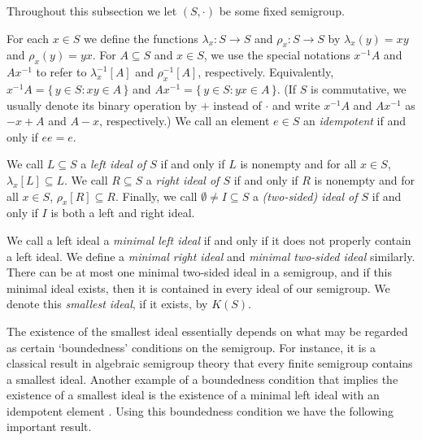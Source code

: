 \documentclass[12pt,showtrims]{memoir}
\theoremstyle{plain}
\theoremstyle{definition}
\begin{document}
Throughout this subsection we let $(S, \cdot)$ be some fixed semigroup. 

For each $x \in S$ we define the functions $\lambda_x \colon S \to S$ and $\rho_x \colon S \to S$ by $\lambda_x(y) = xy$ and $\rho_x(y) = yx$. 
For $A \subseteq S$ and $x \in S$, we use the special notations $x^{-1}A$ and $Ax^{-1}$ to refer to $\lambda_x^{-1}[A]$ and $\rho_x^{-1}[A]$, respectively. 
Equivalently, $x^{-1}A = \{\, y \in S : xy \in A \,\}$ and $Ax^{-1} = \{\, y \in S : yx \in A \,\}$.
(If $S$ is commutative, we usually denote its binary operation by $+$ instead of $\cdot$ and write $x^{-1}A$ and $Ax^{-1}$ as $-x+A$ and $A-x$, respectively.)
We call an element $e \in S$ an \emph{idempotent} if and only if $ee = e$.

We call $L \subseteq S$ a \emph{left ideal of $S$} if and only if $L$ is nonempty and for all $x \in S$, $\lambda_x[L] \subseteq L$. 
We call $R \subseteq S$ a \emph{right ideal of $S$} if and only if $R$ is nonempty and for all $x \in S$, $\rho_x[R] \subseteq R$. 
Finally, we call $\emptyset \ne I \subseteq S$ a \emph{(two-sided) ideal of $S$} if and only if $I$ is both a left and right ideal.

We call a left ideal a \emph{minimal left ideal} if and only if it does not properly contain a left ideal.
We define a \emph{minimal right ideal} and \emph{minimal two-sided ideal} similarly.
There can be at most one minimal two-sided ideal in a semigroup, and if this minimal ideal exists, then it is contained in every ideal of our semigroup.
We denote this \emph{smallest ideal}, if it exists, by $K(S)$.%

The existence of the smallest ideal essentially depends on what may be regarded as certain `boundedness' conditions on the semigroup.
For instance, it is a classical result in algebraic semigroup theory that every finite semigroup contains a smallest ideal.
Another example of a boundedness condition that implies the existence of a smallest ideal is the existence of a minimal left ideal with an idempotent element \cite[Theorem 1.59]{Hindman:1998fk}. 
Using this boundedness condition we have the following important result.
\end{document}
